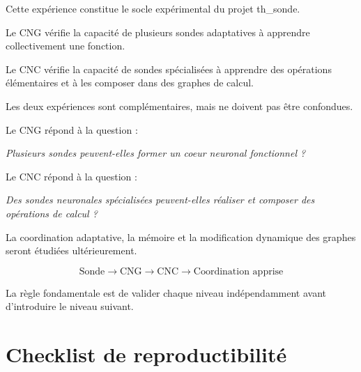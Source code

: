 \documentclass[11pt,a4paper]{article}
\newcommand{\CNG}{\textsc{CNG}}
\newcommand{\CNC}{\textsc{CNC}}
\begin{document}
Cette expérience constitue le socle expérimental
du projet th\_sonde.

Le \CNG{} vérifie la capacité de plusieurs sondes
adaptatives à apprendre collectivement une fonction.

Le \CNC{} vérifie la capacité de sondes spécialisées
à apprendre des opérations élémentaires et à les
composer dans des graphes de calcul.

Les deux expériences sont complémentaires, mais
ne doivent pas être confondues.

Le CNG répond à la question :

\begin{center}
\textit{Plusieurs sondes peuvent-elles former
un coeur neuronal fonctionnel ?}
\end{center}

Le CNC répond à la question :

\begin{center}
\textit{Des sondes neuronales spécialisées peuvent-elles
réaliser et composer des opérations de calcul ?}
\end{center}

La coordination adaptative, la mémoire et la modification
dynamique des graphes seront étudiées ultérieurement.

\[
\boxed{
\text{Sonde}
\rightarrow
\text{CNG}
\rightarrow
\text{CNC}
\rightarrow
\text{Coordination apprise}
}
\]

La règle fondamentale est de valider chaque niveau
indépendamment avant d'introduire le niveau suivant.

\appendix
\section{Checklist de reproductibilité}
\end{document}
